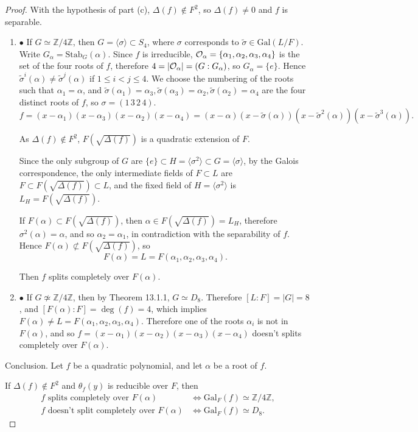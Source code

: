 \documentclass[11pt,a4paper]{article}
\newcommand{\be} {\begin{enumerate}}
\newcommand{\ee} {\end{enumerate}}
\newcommand{\Z}{\mathbb{Z}}
\newcommand{\Gal}{\mathrm{Gal}}
\begin{document}
\begin{proof}
With the hypothesis of part (c), $\Delta(f) \not \in F^2$, so $\Delta(f) \ne 0$ and $f$ is separable.

\be
 \item[$\bullet$] If $G \simeq \Z/4\Z$, then 
$G = \langle \sigma \rangle \subset S_4$,  where $\sigma$ corresponds to $\tilde{\sigma} \in \Gal(L/F)$. Write $G_\alpha = \mathrm{Stab}_G(\alpha)$. Since $f$ is irreducible, ${\cal O}_\alpha = \{\alpha_1,\alpha_2,\alpha_3,\alpha_4\}$ is the set of the four roots of $f$, therefore $4 = |{\cal O}_\alpha| = (G: G_\alpha)$, so $G_{\alpha} = \{e\}$. Hence $\tilde{\sigma}^i(\alpha) \ne\tilde{\sigma}^j(\alpha)$ if $1\leq i < j \leq 4$.   We choose the numbering of the roots such that $\alpha_1 = \alpha$, and $\tilde{\sigma}(\alpha_1) = \alpha_3,\tilde{\sigma}(\alpha_3) = \alpha_2,\tilde{\sigma}(\alpha_2) = \alpha_4$ are the four distinct roots of $f$, so $\sigma = (1\,3\,2\,4)$.
$$f = (x-\alpha_1)(x-\alpha_3)(x-\alpha_2)(x-\alpha_4) = (x-\alpha)(x-\tilde{\sigma}(\alpha))(x-\tilde{\sigma}^2(\alpha))(x-\tilde{\sigma}^3(\alpha)).$$

As  $\Delta(f) \not \in F^2$,  $F(\sqrt{\Delta(f)})$ is a quadratic extension of $F$.

Since the only subgroup of $G$ are $\{e\} \subset H =\langle \sigma^2 \rangle \subset G = \langle \sigma \rangle$, by the Galois correspondence, the only intermediate fields of $F\subset L$ are $F \subset F(\sqrt{\Delta(f)})\subset L$, and the fixed field of $H = \langle \sigma^2 \rangle$ is $L_H =  F(\sqrt{\Delta(f)})$.

If $F(\alpha) \subset F(\sqrt{\Delta(f)})$, then $\alpha \in F(\sqrt{\Delta(f)}) = L_H$, therefore $\sigma^2(\alpha) = \alpha$, and so $\alpha_2 = \alpha_1$, in contradiction with the separability of $f$. Hence $F(\alpha) \not \subset F(\sqrt{\Delta(f)})$, so $$F(\alpha) = L = F(\alpha_1,\alpha_2,\alpha_3,\alpha_4).$$

Then $f$ splits completely over $F(\alpha)$.


 \item[$\bullet$] If $G \not \simeq \Z/4\Z$, then by Theorem 13.1.1, $G \simeq D_8$. Therefore $[L : F] = |G| = 8$, and $[F(\alpha) : F] = \deg(f) = 4$, which implies $F(\alpha) \ne L = F(\alpha_1,\alpha_2,\alpha_3,\alpha_4)$.
 Therefore one of the roots $\alpha_i$ is not in $F(\alpha)$, and so $f =(x-\alpha_1)(x-\alpha_2)(x-\alpha_3)(x-\alpha_4)$ doesn't splits completely over $F(\alpha)$.
\ee



Conclusion. Let $f$ be a quadratic polynomial, and let $\alpha$ be a root of $f$.

 If $\Delta(f) \not \in F^2$ and $\theta_f(y)$ is reducible over $F$, then
\begin{align*}
f \text { splits completely over } F(\alpha) &\iff \Gal_F(f) \simeq \Z/4\Z,\\
f \text { doesn't split completely over } F(\alpha) &\iff \Gal_F(f) \simeq D_8.
\end{align*}
\end{proof}
\end{document}
